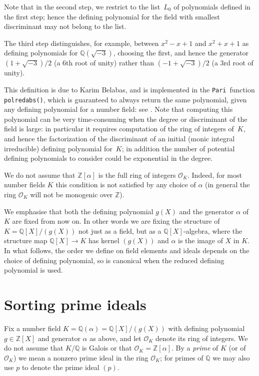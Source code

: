 \documentclass{article}
\def\Pari{{\tt Pari}}
\def\Z{{\mathbb Z}}
\def\Q{{\mathbb Q}}
\def\OO{{\mathcal O}}
\begin{document}
Note that in the second step, we restrict to the list~$L_0$ of
polynomials defined in the first step; hence the defining polynomial
for the field with smallest discriminant may not belong to the list.

The third step distinguishes, for example, between $x^2-x+1$ and
$x^2+x+1$ as defining polynomials for $\Q(\sqrt{-3})$, choosing the
first, and hence the generator $(1+\sqrt{-3})/2$ (a 6th root of unity)
rather than $(-1+\sqrt{-3})/2$ (a 3rd root of unity).

This definition is due to Karim Belabas, and is implemented in the
\Pari\ function {\tt polredabs()}, which is guaranteed to always
return the same polynomial, given any defining polynomial for a number
field: see \cite{polredabs}.  Note that computing this polynomial can
be very time-consuming when the degree or discriminant of the field is
large: in particular it requires computation of the ring of integers
of~$K$, and hence the factorization of the discriminant of an initial
(monic integral irreducible) defining polynomial for~$K$; in addition the number
of potential defining polynomials to consider could be exponential in the
degree.

We do not assume that $\Z[\alpha]$ is the full ring of integers
$\OO_K$.  Indeed, for most number fields $K$ this condition is
not satisfied by any choice of $\alpha$ (in general the ring $\OO_K$
will not be monogenic over $\Z$).

We emphasise that both the defining polynomial $g(X)$ and the
generator $\alpha$ of~$K$ are fixed from now on.  In other words we
are fixing the structure of $K=\Q[X]/(g(X))$ not just as a field, but
as a $\Q[X]$-algebra, where the structure map $\Q[X]\to K$ has kernel
$(g(X))$ and $\alpha$ is the image of $X$ in $K$.  In what follows,
the order we define on field elements and ideals depends on the choice
of defining polynomial, so is canonical when the reduced defining
polynomial is used.


\section{Sorting prime ideals}\label{sec:primes}
Fix a number field $K=\Q(\alpha)=\Q[X]/(g(X))$ with defining
polynomial $g\in\Z[X]$ and generator $\alpha$ as above, and let
$\OO_K$ denote its ring of integers.  We do not assume that $K/\Q$ is
Galois or that $\OO_K=\Z[\alpha]$.  By a \emph{prime} of $K$ (or of
$\OO_K$) we mean a nonzero prime ideal in the ring $\OO_K$; for primes
of $\Q$ we may also use $p$ to denote the prime ideal $(p)$.
\end{document}
